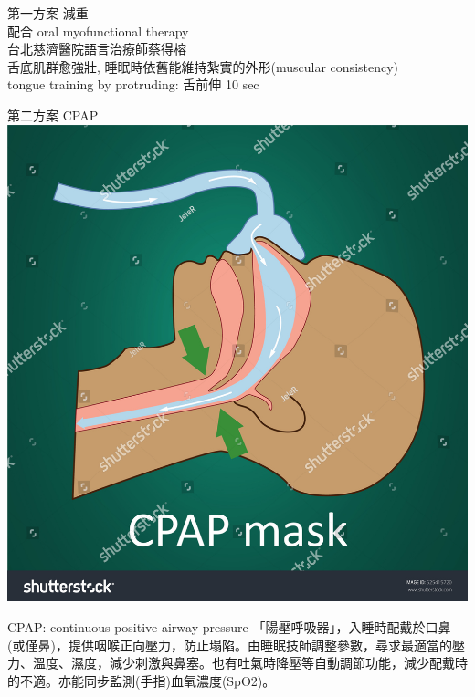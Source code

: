 \documentclass[aspectratio=169]{beamer}
\begin{document}
\begin{frame}{第一方案}
減重\\
配合 oral myofunctional therapy\\
台北慈濟醫院語言治療師蔡得榕\\
舌底肌群愈強壯, 睡眠時依舊能維持紮實的外形(muscular consistency)\\
tongue training by protruding: 舌前伸 10 sec\\

\end{frame}

\begin{frame}{第二方案 CPAP}
    \centering
    \includegraphics[height=0.30\textwidth]{stock-vector-vector-illustration-of-normal-breathing-with-cpap-mask-625415720.jpg}
    
    \begin{block}{CPAP: continuous positive airway pressure}
    「陽壓呼吸器」，入睡時配戴於口鼻(或僅鼻)，提供咽喉正向壓力，防止塌陷。由睡眠技師調整參數，尋求最適當的壓力、溫度、濕度，減少刺激與鼻塞。也有吐氣時降壓等自動調節功能，減少配戴時的不適。亦能同步監測(手指)血氧濃度(SpO2)。
    \end{block}

\end{frame}
\end{document}
